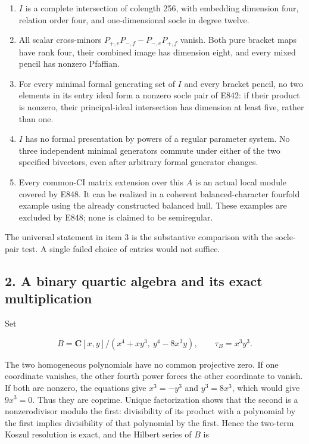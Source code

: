 \begin{enumerate}
\def\labelenumi{\arabic{enumi}.}
\tightlist
\item
  \(I\) is a complete intersection of colength 256, with embedding dimension
  four, relation order four, and one-dimensional socle in degree twelve.
\item
  All scalar cross-minors \(P_{+,e}P_{-,f}-P_{-,e}P_{+,f}\) vanish. Both pure
  bracket maps have rank four, their combined image has dimension eight,
  and every mixed pencil has nonzero Pfaffian.
\item
  For every minimal formal generating set of \(I\) and every bracket pencil,
  no two elements in its entry ideal form a nonzero socle pair of E842:
  if their product is nonzero, their principal-ideal intersection has
  dimension at least five, rather than one.
\item
  \(I\) has no formal presentation by powers of a regular parameter system.
  No three independent minimal generators commute under either of the
  two specified bivectors, even after arbitrary formal generator changes.
\item
  Every common-CI matrix extension over this \(A\) is an actual local module
  covered by E848. It can be realized in a coherent balanced-character
  fourfold example using the already constructed balanced hull. These
  examples are excluded by E848; none is claimed to be semiregular.
\end{enumerate}

The universal statement in item 3 is the substantive comparison with the
socle-pair test. A single failed choice of entries would not suffice.

\subsection{2. A binary quartic algebra and its exact multiplication}\label{SF-E848W:s2}

Set

\[
 B=\mathbf C[x,y]/(x^4+xy^3,\ y^4-8x^3y),
 \qquad \tau_B=x^3y^3.
\tag{QW.3}
\]

The two homogeneous polynomials have no common projective zero. If one
coordinate vanishes, the other fourth power forces the other coordinate
to vanish. If both are nonzero, the equations give \(x^3=-y^3\) and \(y^3=8x^3\),
which would give \(9x^3=0\). Thus they are coprime. Unique factorization shows
that the second is a nonzerodivisor modulo the first: divisibility of its
product with a polynomial by the first implies divisibility of that
polynomial by the first. Hence the two-term Koszul resolution is exact,
and the Hilbert series of \(B\) is

